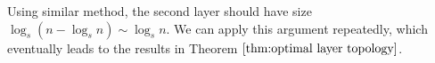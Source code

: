 \documentclass[a4paper,UKenglish]{lipics}
\theoremstyle{definition}
\begin{document}
Using similar method, the second layer should have size $\log_s ( n - \log_s n) \sim \log_s n$.
We can apply this argument repeatedly, which eventually leads to the results in Theorem $\ref{thm:optimal layer topology}$.




%


%
%
%
%
%
%
%
%
%
\end{document}
